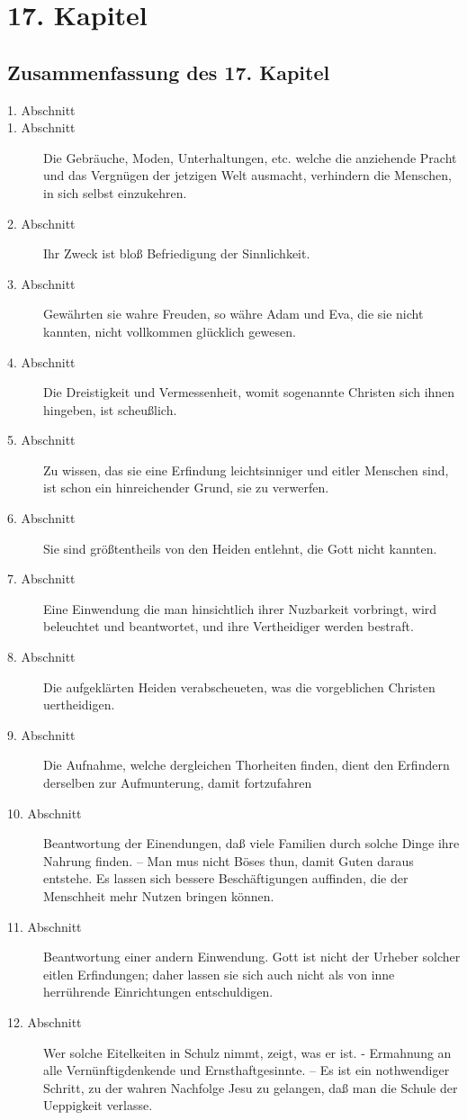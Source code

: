 
\chapter{17. Kapitel}
\section{Zusammenfassung des 17. Kapitel}
\small
\begin{description}
\item[1. Abschnitt]
\item[1. Abschnitt] Die Gebräuche, Moden, Unterhaltungen, etc. welche die anziehende Pracht und das Vergnügen der jetzigen Welt ausmacht, verhindern die Menschen, in sich selbst einzukehren.
\item[2. Abschnitt] Ihr Zweck ist bloß Befriedigung der Sinnlichkeit.
\item[3. Abschnitt] Gewährten sie wahre Freuden, so währe Adam und Eva, die sie nicht kannten, nicht vollkommen glücklich gewesen.
\item[4. Abschnitt] Die Dreistigkeit und Vermessenheit, womit sogenannte Christen sich ihnen hingeben, ist scheußlich.
\item[5. Abschnitt] Zu wissen, das sie eine Erfindung leichtsinniger und eitler Menschen sind, ist schon ein hinreichender Grund, sie zu verwerfen.
\item[6. Abschnitt] Sie sind größtentheils von den Heiden entlehnt, die Gott nicht kannten.
\item[7. Abschnitt] Eine Einwendung die man hinsichtlich ihrer Nuzbarkeit vorbringt, wird beleuchtet und beantwortet, und ihre Vertheidiger werden bestraft.
\item[8. Abschnitt] Die aufgeklärten Heiden verabscheueten, was die vorgeblichen Christen uertheidigen.
\item[9. Abschnitt] Die Aufnahme, welche dergleichen Thorheiten finden, dient den Erfindern derselben zur Aufmunterung, damit fortzufahren
\item[10. Abschnitt] Beantwortung der Einendungen, daß viele Familien durch solche Dinge ihre Nahrung finden. -- Man mus nicht Böses thun, damit Guten daraus entstehe. Es lassen sich bessere Beschäftigungen auffinden, die der Menschheit mehr Nutzen bringen können.
\item[11. Abschnitt] Beantwortung einer andern Einwendung. Gott ist nicht der Urheber solcher eitlen Erfindungen; daher lassen sie sich auch nicht als von inne herrührende Einrichtungen entschuldigen.
\item[12. Abschnitt] Wer solche Eitelkeiten in Schulz nimmt, zeigt, was er ist. - Ermahnung an alle Vernünftigdenkende und Ernsthaftgesinnte. -- Es ist ein nothwendiger Schritt, zu der wahren Nachfolge Jesu zu gelangen, daß man die Schule der Ueppigkeit verlasse.

\end{description}
\normalsize

